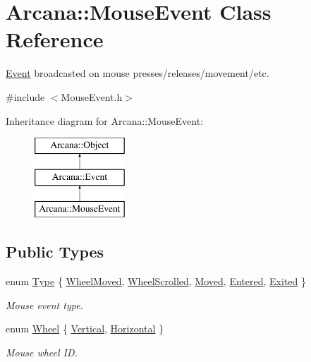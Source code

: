 \hypertarget{class_arcana_1_1_mouse_event}{}\section{Arcana\+:\+:Mouse\+Event Class Reference}
\label{class_arcana_1_1_mouse_event}


\mbox{\hyperlink{class_arcana_1_1_event}{Event}} broadcasted on mouse presses/releases/movement/etc.  




{\ttfamily \#include $<$Mouse\+Event.\+h$>$}

Inheritance diagram for Arcana\+:\+:Mouse\+Event\+:\begin{figure}[H]
\begin{center}
\leavevmode
\includegraphics[height=3.000000cm]{class_arcana_1_1_mouse_event}
\end{center}
\end{figure}
\subsection*{Public Types}
\begin{DoxyCompactItemize}
\item 
enum \mbox{\hyperlink{class_arcana_1_1_mouse_event_aef6393d6d26e822bd527617c64acadea}{Type}} \{ \newline
\mbox{\hyperlink{class_arcana_1_1_mouse_event_aef6393d6d26e822bd527617c64acadeaa39ff2644effe01ad775b26b729c8c6fd}{Wheel\+Moved}}, 
\mbox{\hyperlink{class_arcana_1_1_mouse_event_aef6393d6d26e822bd527617c64acadeaad7163efce4b5c60707606f4905311c47}{Wheel\+Scrolled}}, 
\mbox{\hyperlink{class_arcana_1_1_mouse_event_aef6393d6d26e822bd527617c64acadeaa6b16a05bed85e41f056fdc640d6c637d}{Moved}}, 
\mbox{\hyperlink{class_arcana_1_1_mouse_event_aef6393d6d26e822bd527617c64acadeaa63a98f046ad0408b1b774f57e4eb659b}{Entered}}, 
\newline
\mbox{\hyperlink{class_arcana_1_1_mouse_event_aef6393d6d26e822bd527617c64acadeaae61245a192edadfee9347c2a524f689e}{Exited}}
 \}
\begin{DoxyCompactList}\small\item\em Mouse event type. \end{DoxyCompactList}\item 
enum \mbox{\hyperlink{class_arcana_1_1_mouse_event_aa658cf03c3ae261e9552804c0e0a46dd}{Wheel}} \{ \mbox{\hyperlink{class_arcana_1_1_mouse_event_aa658cf03c3ae261e9552804c0e0a46dda42b46757e2b876a14045d2ce8e4a5302}{Vertical}}, 
\mbox{\hyperlink{class_arcana_1_1_mouse_event_aa658cf03c3ae261e9552804c0e0a46dda5c63bd8a3472b3726d58675251036727}{Horizontal}}
 \}
\begin{DoxyCompactList}\small\item\em Mouse wheel ID. \end{DoxyCompactList}\end{DoxyCompactItemize}
